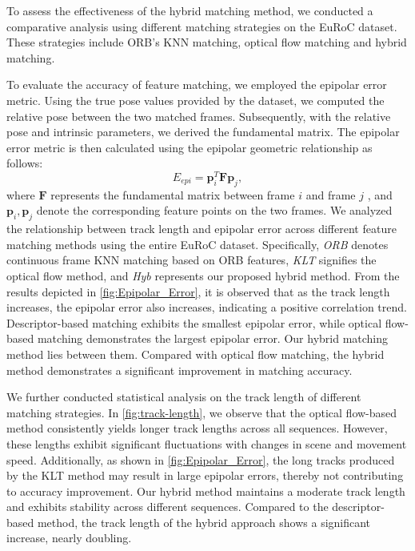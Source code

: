 To assess the effectiveness of the hybrid matching method, we conducted a comparative analysis using different matching strategies on the EuRoC dataset. These strategies include ORB's KNN matching, optical flow matching and hybrid matching. 

To evaluate the accuracy of feature matching, we employed the epipolar error metric. Using the true pose values provided by the dataset, we computed the relative pose between the two matched frames. Subsequently, with the relative pose and intrinsic parameters, we derived the fundamental matrix. The epipolar error metric is then calculated using the epipolar geometric relationship as follows:
\begin{equation}
        E_{epi} = \textbf{p}_i^T \textbf{F} \textbf{p}_j,
\end{equation}
where $\textbf{F}$ represents the fundamental matrix between frame $i$ and frame $j$ ,  and $\textbf{p}_i,\textbf{p}_j$ denote the corresponding feature points on the two frames.
We analyzed the relationship between track length and epipolar error across different feature matching methods using the entire EuRoC dataset. Specifically, \textit{ORB} denotes continuous frame KNN matching based on ORB features, \textit{KLT} signifies the optical flow method, and \textit{Hyb} represents our proposed hybrid method. From the results depicted in \cref{fig:Epipolar_Error}, it is observed that as the track length increases, the epipolar error also increases, indicating a positive correlation trend. Descriptor-based matching exhibits the smallest epipolar error, while optical flow-based matching demonstrates the largest epipolar error. Our hybrid matching method lies between them. Compared with optical flow matching, the hybrid method demonstrates a significant improvement in matching accuracy.

We further conducted statistical analysis on the track length of different matching strategies. In \cref{fig:track-length}, we observe that the optical flow-based method consistently yields longer track lengths across all sequences. However, these lengths exhibit significant fluctuations with changes in scene and movement speed. Additionally, as shown in \cref{fig:Epipolar_Error},  the long tracks produced by the KLT method may result in large epipolar errors, thereby not contributing to accuracy improvement. Our hybrid method maintains a moderate track length and exhibits stability across different sequences. Compared to the descriptor-based method, the track length of the hybrid approach shows a significant increase, nearly doubling.

